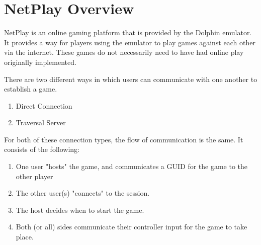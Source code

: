 \documentclass[conference]{IEEEtran}
\begin{document}
\section{NetPlay Overview}
NetPlay is an online gaming platform that is provided by the Dolphin emulator. It provides a way for players using the emulator to play games against each other via the internet. These games do not necessarily need to have had online play originally implemented. 

There are two different ways in which users can communicate with one another to establish a game.
\vspace{0.5cm}
\begin{enumerate}  
\item Direct Connection
\item Traversal Server
\end{enumerate}
\vspace{0.5cm}
For both of these connection types, the flow of communication is the same. It consists of the following:

\begin{enumerate}  
\item One user "hosts" the game, and communicates a GUID for the game to the other player
\item The other user(s) "connects" to the session.
\item The host decides when to start the game.
\item Both (or all) sides communicate their controller input for the game to take place.
\end{enumerate}
\vspace{0.cm}
\end{document}
